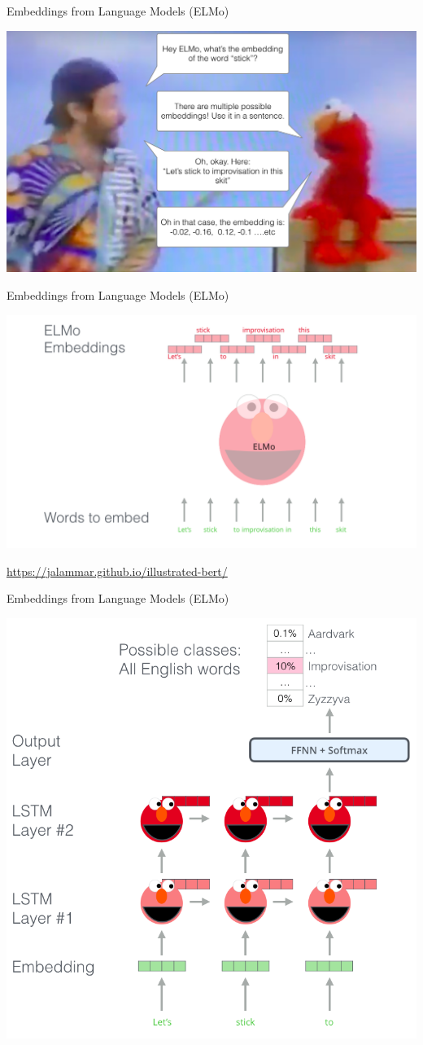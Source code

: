 \documentclass[notes,12pt, aspectratio=169]{beamer}
\begin{document}
\begin{frame}{ Embeddings from Language Models (ELMo)}
	\begin{center}
			\includegraphics[width=.8\linewidth]{ elmo_and_robby.png}
		\end{center}
\end{frame}


\begin{frame}{ Embeddings from Language Models (ELMo)}
	\begin{center}
		\includegraphics[width=.8\linewidth]{elmo1.png}
	\end{center}
	\vfill
	\footnotesize
	{\color{blue} \url{https://jalammar.github.io/illustrated-bert/}  } 
\end{frame}


\begin{frame}{ Embeddings from Language Models (ELMo)}
	\begin{center}
		\includegraphics[width=.5\linewidth]{elmo2.png}
	\end{center}
\end{frame}
\end{document}
